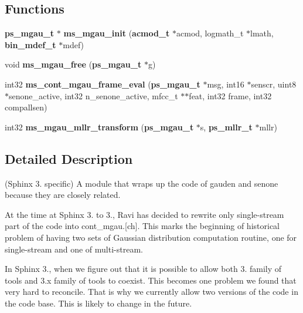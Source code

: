\subsection*{Functions}
\begin{DoxyCompactItemize}
\item 
{\bf ps\+\_\+mgau\+\_\+t} $\ast$ {\bfseries ms\+\_\+mgau\+\_\+init} ({\bf acmod\+\_\+t} $\ast$acmod, logmath\+\_\+t $\ast$lmath, {\bf bin\+\_\+mdef\+\_\+t} $\ast$mdef)\label{ms__mgau_8h_a7dbdcb8e1901665b955e324eefdfeea3}

\item 
void {\bfseries ms\+\_\+mgau\+\_\+free} ({\bf ps\+\_\+mgau\+\_\+t} $\ast$g)\label{ms__mgau_8h_ae553fda1fe6082d50cb95b06a85b2be6}

\item 
int32 {\bfseries ms\+\_\+cont\+\_\+mgau\+\_\+frame\+\_\+eval} ({\bf ps\+\_\+mgau\+\_\+t} $\ast$msg, int16 $\ast$senscr, uint8 $\ast$senone\+\_\+active, int32 n\+\_\+senone\+\_\+active, mfcc\+\_\+t $\ast$$\ast$feat, int32 frame, int32 compallsen)\label{ms__mgau_8h_ab1f5637b68fdc1a4d24e4d6275353216}

\item 
int32 {\bfseries ms\+\_\+mgau\+\_\+mllr\+\_\+transform} ({\bf ps\+\_\+mgau\+\_\+t} $\ast$s, {\bf ps\+\_\+mllr\+\_\+t} $\ast$mllr)\label{ms__mgau_8h_ad3fe464ff15e735bfef15e628c5433fc}

\end{DoxyCompactItemize}


\subsection{Detailed Description}
(Sphinx 3. specific) A module that wraps up the code of gauden and senone because they are closely related. 

At the time at Sphinx 3. to 3., Ravi has decided to rewrite only single-\/stream part of the code into cont\+\_\+mgau.[ch]. This marks the beginning of historical problem of having two sets of Gaussian distribution computation routine, one for single-\/stream and one of multi-\/stream.

In Sphinx 3., when we figure out that it is possible to allow both 3. family of tools and 3.\+x family of tools to coexist. This becomes one problem we found that very hard to reconcile. That is why we currently allow two versions of the code in the code base. This is likely to change in the future. 